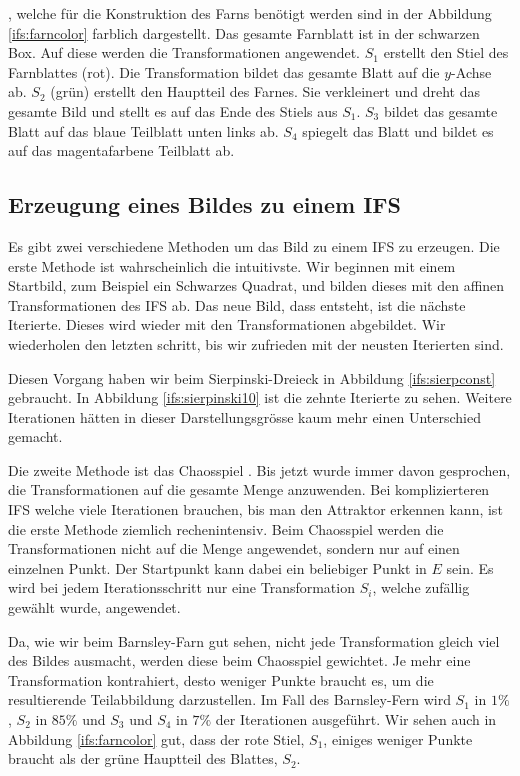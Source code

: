 , welche für die Konstruktion des Farns benötigt werden sind in der Abbildung \ref{ifs:farncolor} farblich dargestellt.
Das gesamte Farnblatt ist in der schwarzen Box.
Auf diese werden die Transformationen angewendet.
$S_1$ erstellt den Stiel des Farnblattes (rot).
Die Transformation bildet das gesamte Blatt auf die $y$-Achse ab.
$S_2$ (grün) erstellt den Hauptteil des Farnes. 
Sie verkleinert und dreht das gesamte Bild und stellt es auf das Ende des Stiels aus $S_1$.
$S_3$ bildet das gesamte Blatt auf das blaue Teilblatt unten links ab.
$S_4$ spiegelt das Blatt und bildet es auf das magentafarbene Teilblatt ab.  
\subsection{Erzeugung eines Bildes zu einem IFS}
Es gibt zwei verschiedene Methoden um das Bild zu einem IFS zu erzeugen.
Die erste Methode ist wahrscheinlich die intuitivste. 
Wir beginnen mit einem Startbild, zum Beispiel ein Schwarzes Quadrat, und bilden dieses mit den affinen Transformationen des IFS ab.
Das neue Bild, dass entsteht, ist die nächste Iterierte.
Dieses wird wieder mit den Transformationen abgebildet.
Wir wiederholen den letzten schritt, bis wir zufrieden mit der neusten Iterierten sind.

Diesen Vorgang haben wir beim Sierpinski-Dreieck in Abbildung \ref{ifs:sierpconst} gebraucht.
In Abbildung \ref{ifs:sierpinski10} ist die zehnte Iterierte zu sehen.
Weitere Iterationen hätten in dieser Darstellungsgrösse kaum mehr einen Unterschied gemacht.


Die zweite Methode ist das Chaosspiel \cite{ifs:chaos}. 
Bis jetzt wurde immer davon gesprochen, die Transformationen auf die gesamte Menge anzuwenden.
Bei komplizierteren IFS welche viele Iterationen brauchen, bis man den Attraktor erkennen kann, ist die erste Methode ziemlich rechenintensiv.
Beim Chaosspiel werden die Transformationen nicht auf die Menge angewendet, sondern nur auf einen einzelnen Punkt.
Der Startpunkt kann dabei ein beliebiger Punkt in $E$ sein.
Es wird bei jedem Iterationsschritt nur eine Transformation $S_i$, welche zufällig gewählt wurde, angewendet.

Da, wie wir beim Barnsley-Farn gut sehen, nicht jede Transformation gleich viel des Bildes ausmacht, werden diese beim Chaosspiel gewichtet.
Je mehr eine Transformation kontrahiert, desto weniger Punkte braucht es, um die resultierende Teilabbildung darzustellen.
Im Fall des Barnsley-Fern wird $S_1$ in $1\%$, $S_2$ in $85\%$ und $S_3$ und $S_4$ in $7\%$ der Iterationen ausgeführt.
Wir sehen auch in Abbildung \ref{ifs:farncolor} gut, dass der rote Stiel, $S_1$, einiges weniger Punkte braucht als der grüne Hauptteil des Blattes, $S_2$.

